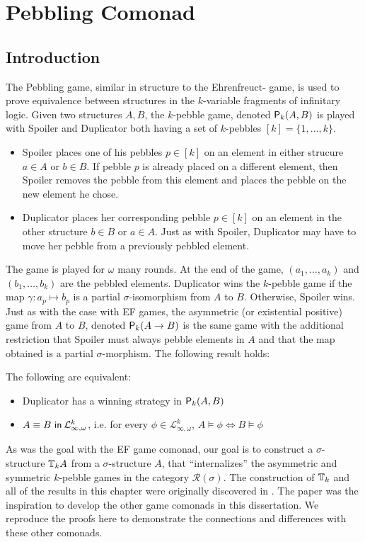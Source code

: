 \chapter{Pebbling Comonad}
\section{Introduction}
The Pebbling game, similar in structure to the Ehrenfreuct-{\Fraisse} game, is used to prove equivalence between structures in the $k$-variable fragments of infinitary logic. Given two structures $A,B$, the $k$-pebble game, denoted ${\mathsf{P}_{k}(A,B)}$ is played with Spoiler and Duplicator both having a set of $k$-pebbles $[k] = \{1,\dots,k\}$.  
\begin{itemize} 
\item Spoiler places one of his pebbles $p \in [k]$ on an element in either strucure $a \in A$ or $b \in B$. If pebble $p$ is already placed on a different element, then Spoiler removes the pebble from this element and places the pebble on the new element he chose.  
\item Duplicator places her corresponding pebble $p \in [k]$ on an element in the other structure $b \in B$ or $a \in A$. Just as with Spoiler, Duplicator may have to move her pebble from a previously pebbled element.
\end{itemize} 
The game is played for $\omega$ many rounds. At the end of the game, $(a_{1},\dots,a_{k})$ and $(b_{1},\dots,b_{k})$ are the pebbled elements. Duplicator wins the $k$-pebble game if the map $\gamma:a_{p} \longmapsto b_{p}$ is a partial $\sigma$-isomorphism from $A$ to $B$. Otherwise, Spoiler wins. Just as with the case with EF games, the asymmetric (or existential positive) game from $A$ to $B$, denoted ${\mathsf{P}_{k}(A \rightarrow B)}$ is the same game with the additional restriction that Spoiler must always pebble elements in $A$ and that the map obtained is a partial $\sigma$-morphism. The following result holds:
\begin{prop}
The following are equivalent:
\begin{itemize}
\item Duplicator has a winning strategy in ${\mathsf{P}_{k}(A,B)}$
\item ${A \equiv B \ \mathsf{in}\: \mathcal{L}^{k}_{\infty,\omega}}$, i.e. for every $\phi \in \mathcal{L}^{k}_{\infty,\omega}$, $A \vDash \phi \Leftrightarrow B \vDash \phi$
\end{itemize}
\end{prop}
As was the goal with the EF game comonad, our goal is to construct a $\sigma$-structure ${\mathbb{T}_{k}A}$ from a $\sigma$-structure $A$, that ``internalizes'' the asymmetric and symmetric $k$-pebble games in the category $\mathcal{R}(\sigma)$. The construction of ${\mathbb{T}_{k}}$ and all of the results in this chapter were originally discovered in \cite{Abramsky2017}. The paper \cite{Abramsky2017} was the inspiration to develop the other game comonads in this dissertation. We reproduce the proofs here to demonstrate the connections and differences with these other comonads.  
